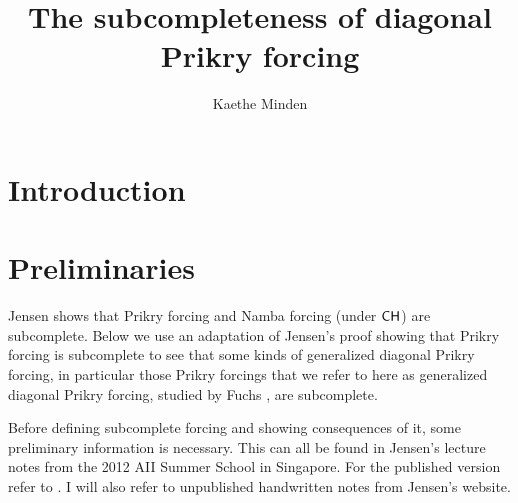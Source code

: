 \documentclass{amsart}
\theoremstyle{definition}
\theoremstyle{remark}
\newcommand{\CH}{\textup{\textsf{CH}}}
\begin{document}
\title{The subcompleteness of diagonal Prikry forcing}

\author[Minden]{Kaethe Minden}
 \address[K.~Minden]{Mathematics, Marlboro College, 2582 South Road, Marlboro, VT 05344}
\date{}     					

\begin{abstract}

\end{abstract}
\maketitle

\section{Introduction}

\section{Preliminaries}
Jensen \cite[Section 3.3]{Jensen:2012fr} shows that Prikry forcing and Namba forcing (under $\CH$) are subcomplete. Below we use an adaptation of Jensen's proof showing that Prikry forcing is subcomplete to see that some kinds of generalized diagonal Prikry forcing, in particular those Prikry forcings that we refer to here as generalized diagonal Prikry forcing, studied by Fuchs \cite{Fuchs:2005kx}, are subcomplete.

Before defining subcomplete forcing and showing consequences of it, some preliminary information is necessary. This can all be found in Jensen's lecture notes from the 2012 AII Summer School in Singapore. For the published version refer to \cite{Jensen:2012fr}. I will also refer to unpublished handwritten notes from Jensen's website.
\end{document}

